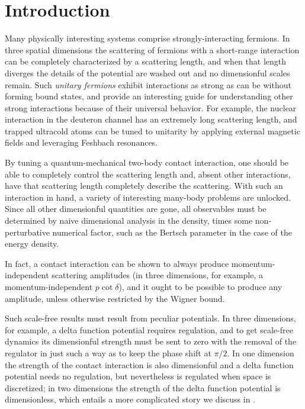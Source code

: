 \section{Introduction}\label{sec:intro}

Many physically interesting systems comprise strongly-interacting fermions.
In three spatial dimensions the scattering of fermions with a short-range interaction can be completely characterized by a scattering length, and when that length diverges the details of the potential are washed out and no dimensionful scales remain.
Such \emph{unitary fermions} exhibit interactions as strong as can be without forming bound states, and provide an interesting guide for understanding other strong interactions because of their universal behavior.
For example, the nuclear interaction in the deuteron channel has an extremely long scattering length, and trapped ultracold atoms can be tuned to unitarity by applying external magnetic fields and leveraging Feshbach resonances.

By tuning a quantum-mechanical two-body contact interaction, one should be able to completely control the scattering length and, absent other interactions, have that scattering length completely describe the scattering.
With such an interaction in hand, a variety of interesting many-body problems are unlocked.
Since all other dimensionful quantities are gone, all observables must be determined by naive dimensional analysis in the density, times some non-perturbative numerical factor, such as the Bertsch parameter\cite{PhysRevC.60.054311} in the case of the energy density.

In fact, a contact interaction can be shown to always produce momentum-independent scattering amplitudes (in three dimensions, for example, a momentum-independent $p \cot \delta$), and it ought to be possible to produce any amplitude, unless otherwise restricted by the Wigner bound\cite{Wigner:1955zz,Phillips:1996ae,Hammer:2010fw}.

Such scale-free results must result from peculiar potentials.
In three dimensions, for example, a delta function potential requires regulation, and to get scale-free dynamics its dimensionful strength must be sent to zero with the removal of the regulator in just such a way as to keep the phase shift at $\pi/2$.
In one dimension the strength of the contact interaction is also dimensionful and a delta function potential needs no regulation, but nevertheless is regulated when space is discretized; in two dimensions the strength of the delta function potential is dimensionless, which entails a more complicated story we discuss in .

